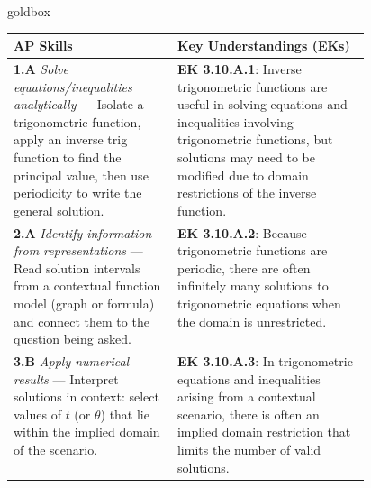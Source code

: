 \documentclass[10pt]{article}
\begin{document}
\begin{skillbox}{goldbox}
\begin{tabularx}{\linewidth}{@{} p{0.46\linewidth} X @{}}
\textbf{AP Skills} & \textbf{Key Understandings (EKs)} \\
\midrule
\textbf{1.A} \textit{Solve equations/inequalities analytically} ---
  Isolate a trigonometric function, apply an inverse trig function to
  find the principal value, then use periodicity to write the general
  solution.
&
\textbf{EK 3.10.A.1}: Inverse trigonometric functions are useful in
solving equations and inequalities involving trigonometric functions,
but solutions may need to be modified due to domain restrictions of
the inverse function. \\[4pt]

\textbf{2.A} \textit{Identify information from representations} ---
  Read solution intervals from a contextual function model (graph or
  formula) and connect them to the question being asked.
&
\textbf{EK 3.10.A.2}: Because trigonometric functions are periodic,
there are often infinitely many solutions to trigonometric equations
when the domain is unrestricted. \\[4pt]

\textbf{3.B} \textit{Apply numerical results} ---
  Interpret solutions in context: select values of $t$ (or $\theta$)
  that lie within the implied domain of the scenario.
&
\textbf{EK 3.10.A.3}: In trigonometric equations and inequalities
arising from a contextual scenario, there is often an implied domain
restriction that limits the number of valid solutions. \\
\end{tabularx}
\end{skillbox}

\vspace{0.08in}
\end{document}
